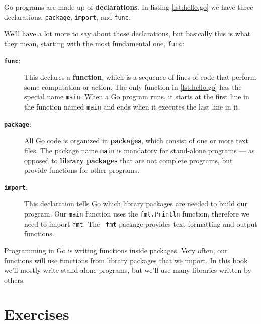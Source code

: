 Go programs are made up of {\bf declarations}. In listing \ref{lst:hello.go}
we have three declarations: {\tt package}, {\tt import}, and {\tt func}.

We'll have a lot more to say about those declarations, but basically this is
what they mean, starting with the most fundamental one, {\tt func}:

\begin{description}

\item[\textbf{\texttt{func}}:] This declares a {\bf function}, which is a
sequence of lines of code that perform some computation or action. The only
function in \ref{lst:hello.go} has the special name {\tt main}. When a Go
program runs, it starts at the first line in the function named {\tt main} and
ends when it executes the last line in it.

\item[\textbf{\texttt{package}}:] All Go code is organized in {\bf packages},
which consist of one or more text files. The package name {\tt main} is
mandatory for stand-alone programs --- as opposed to {\bf library packages}
that are not complete programs, but provide functions for other programs.

\item[\textbf{\texttt{import}}:] This declaration tells Go which library
packages are needed to build our program. Our {\tt main} function uses the
{\tt fmt.Println} function, therefore we need to import {\tt fmt}. The {\tt
fmt} package provides text formatting and output functions.

\end{description}

Programming in Go is writing functions inside packages. Very often, our
functions will use functions from library packages that we import. In this
book we'll mostly write stand-alone programs, but we'll use many libraries
written by others.


\section{Exercises}

